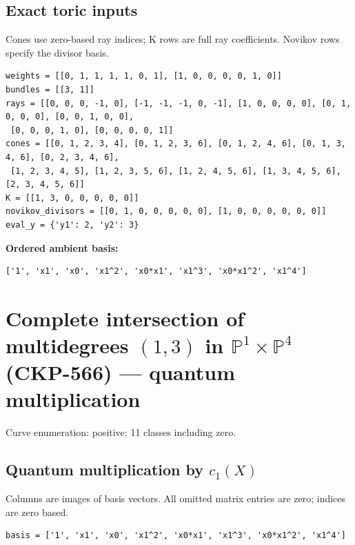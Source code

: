 \documentclass[10pt,a4paper]{article}
\begin{document}
\subsection*{Exact toric inputs}
Cones use zero-based ray indices; K rows are full ray coefficients. Novikov rows specify the divisor basis.

\begin{lstlisting}
weights = [[0, 1, 1, 1, 1, 0, 1], [1, 0, 0, 0, 0, 1, 0]]
bundles = [[3, 1]]
rays = [[0, 0, 0, -1, 0], [-1, -1, -1, 0, -1], [1, 0, 0, 0, 0], [0, 1, 0, 0, 0], [0, 0, 1, 0, 0],
 [0, 0, 0, 1, 0], [0, 0, 0, 0, 1]]
cones = [[0, 1, 2, 3, 4], [0, 1, 2, 3, 6], [0, 1, 2, 4, 6], [0, 1, 3, 4, 6], [0, 2, 3, 4, 6],
 [1, 2, 3, 4, 5], [1, 2, 3, 5, 6], [1, 2, 4, 5, 6], [1, 3, 4, 5, 6], [2, 3, 4, 5, 6]]
K = [[1, 3, 0, 0, 0, 0, 0]]
novikov_divisors = [[0, 1, 0, 0, 0, 0, 0], [1, 0, 0, 0, 0, 0, 0]]
eval_y = {'y1': 2, 'y2': 3}
\end{lstlisting}

\textbf{Ordered ambient basis:}
\begin{lstlisting}
['1', 'x1', 'x0', 'x1^2', 'x0*x1', 'x1^3', 'x0*x1^2', 'x1^4']
\end{lstlisting}

\clearpage\section*{Complete intersection of multidegrees $(1,3)$ in $\mathbb P^{1}\times \mathbb P^{4}$ (CKP-566) --- quantum multiplication}

Curve enumeration: positive; 11 classes including zero.
\subsection*{Quantum multiplication by $c_1(X)$}
Columns are images of basis vectors. All omitted matrix entries are zero; indices are zero based.

\begin{lstlisting}
basis = ['1', 'x1', 'x0', 'x1^2', 'x0*x1', 'x1^3', 'x0*x1^2', 'x1^4']
\end{lstlisting}
\end{document}
